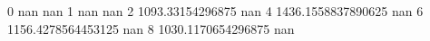 0 nan nan
1 nan nan
2 1093.33154296875 nan
4 1436.1558837890625 nan
6 1156.4278564453125 nan
8 1030.1170654296875 nan
